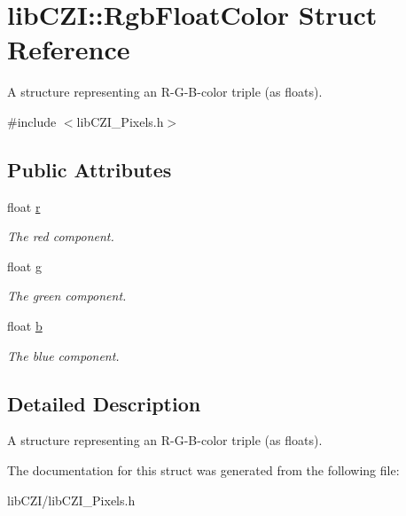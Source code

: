 \hypertarget{structlib_c_z_i_1_1_rgb_float_color}{}\section{lib\+C\+ZI\+:\+:Rgb\+Float\+Color Struct Reference}
\label{structlib_c_z_i_1_1_rgb_float_color}


A structure representing an R-\/\+G-\/\+B-\/color triple (as floats).  




{\ttfamily \#include $<$lib\+C\+Z\+I\+\_\+\+Pixels.\+h$>$}

\subsection*{Public Attributes}
\begin{DoxyCompactItemize}
\item 
\mbox{\label{structlib_c_z_i_1_1_rgb_float_color_a41c20a73ab74d9ade494315511267ef2}} 
float \hyperlink{structlib_c_z_i_1_1_rgb_float_color_a41c20a73ab74d9ade494315511267ef2}{r}
\begin{DoxyCompactList}\small\item\em The red component. \end{DoxyCompactList}\item 
\mbox{\label{structlib_c_z_i_1_1_rgb_float_color_ac2d9348df01510bd606f011cb4930254}} 
float \hyperlink{structlib_c_z_i_1_1_rgb_float_color_ac2d9348df01510bd606f011cb4930254}{g}
\begin{DoxyCompactList}\small\item\em The green component. \end{DoxyCompactList}\item 
\mbox{\label{structlib_c_z_i_1_1_rgb_float_color_a599c4b00addc9c1cf88c9ef943903064}} 
float \hyperlink{structlib_c_z_i_1_1_rgb_float_color_a599c4b00addc9c1cf88c9ef943903064}{b}
\begin{DoxyCompactList}\small\item\em The blue component. \end{DoxyCompactList}\end{DoxyCompactItemize}


\subsection{Detailed Description}
A structure representing an R-\/\+G-\/\+B-\/color triple (as floats). 

The documentation for this struct was generated from the following file\+:\begin{DoxyCompactItemize}
\item 
lib\+C\+Z\+I/lib\+C\+Z\+I\+\_\+\+Pixels.\+h\end{DoxyCompactItemize}
